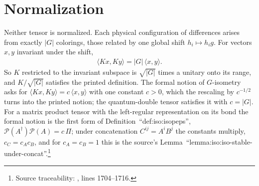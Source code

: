 \documentclass{article}
\begin{document}
\section{Normalization}
Neither tensor is normalized. Each physical configuration of differences
arises from exactly $|G|$ colorings, those related by one global shift
$h_i\mapsto h_ig$. For vectors $x,y$ invariant under the shift,
\begin{align}
    \langle Kx,Ky\rangle=|G|\,\langle x,y\rangle .
    \label{eq:rmp_peps_qd_isometry}
\end{align}
So $K$ restricted to the invariant subspace is $\sqrt{|G|}$ times a
unitary onto its range, and $K/\sqrt{|G|}$ satisfies the printed
definition. The formal notion of $G$-isometry asks for
$\langle Kx,Ky\rangle=c\,\langle x,y\rangle$ with one constant $c>0$,
which the rescaling by $c^{-1/2}$ turns into the printed notion; the
quantum-double tensor satisfies it with $c=|G|$. For a matrix product
tensor with the left-regular representation on its bond the formal notion
is the first form of Definition~``def:iso:isopeps'',
$\mathcal P(A^\dagger)\mathcal P(A)=c\,\Pi$; under concatenation
$C^{ij}=A^iB^j$ the constants multiply, $c_C=c_Ac_B$, and for $c_A=c_B=1$
this is the source's Lemma~``lemma:iso:iso-stable-under-concat''.\footnote{Source
    traceability: , lines
    1704--1716.}
\end{document}
